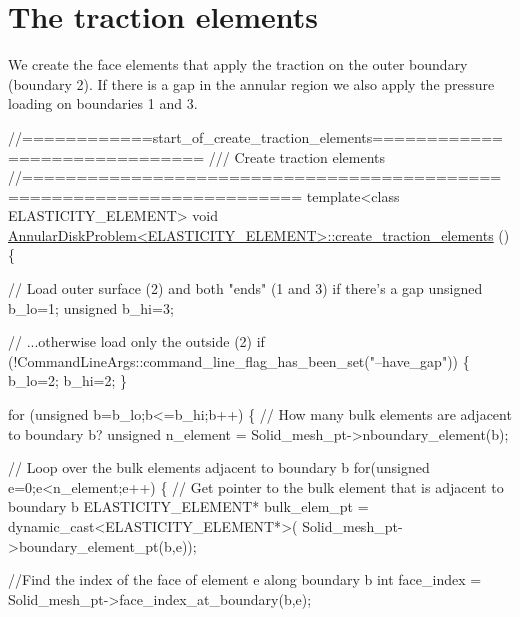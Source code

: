  

\hypertarget{index_traction_elements}{}\section{The traction elements}\label{index_traction_elements}
We create the face elements that apply the traction on the outer boundary (boundary 2). If there is a gap in the annular region we also apply the pressure loading on boundaries 1 and 3.

 
\begin{DoxyCodeInclude}
\textcolor{comment}{//============start\_of\_create\_traction\_elements==============================}
\textcolor{comment}{/// Create traction elements }
\textcolor{comment}{}\textcolor{comment}{//=======================================================================}
\textcolor{keyword}{template}<\textcolor{keyword}{class} ELASTICITY\_ELEMENT>
\textcolor{keywordtype}{void} \hyperlink{classAnnularDiskProblem_aeab547741d3b500af5f465e52e1ba57c}{AnnularDiskProblem<ELASTICITY\_ELEMENT>::create\_traction\_elements}
      ()
\{

 \textcolor{comment}{// Load outer surface (2) and both "ends" (1 and 3) if there's a gap}
 \textcolor{keywordtype}{unsigned} b\_lo=1;
 \textcolor{keywordtype}{unsigned} b\_hi=3;

 \textcolor{comment}{// ...otherwise load only the outside (2)}
 \textcolor{keywordflow}{if} (!CommandLineArgs::command\_line\_flag\_has\_been\_set(\textcolor{stringliteral}{"--have\_gap"}))
  \{     
   b\_lo=2;
   b\_hi=2;
  \}

 \textcolor{keywordflow}{for} (\textcolor{keywordtype}{unsigned} b=b\_lo;b<=b\_hi;b++)
  \{
   \textcolor{comment}{// How many bulk elements are adjacent to boundary b?}
   \textcolor{keywordtype}{unsigned} n\_element = Solid\_mesh\_pt->nboundary\_element(b);
   
   \textcolor{comment}{// Loop over the bulk elements adjacent to boundary b}
   \textcolor{keywordflow}{for}(\textcolor{keywordtype}{unsigned} e=0;e<n\_element;e++)
    \{
     \textcolor{comment}{// Get pointer to the bulk element that is adjacent to boundary b}
     ELASTICITY\_ELEMENT* bulk\_elem\_pt = \textcolor{keyword}{dynamic\_cast<}ELASTICITY\_ELEMENT*\textcolor{keyword}{>}(
      Solid\_mesh\_pt->boundary\_element\_pt(b,e));
     
     \textcolor{comment}{//Find the index of the face of element e along boundary b}
     \textcolor{keywordtype}{int} face\_index = Solid\_mesh\_pt->face\_index\_at\_boundary(b,e);
     

\end{DoxyCodeInclude}
